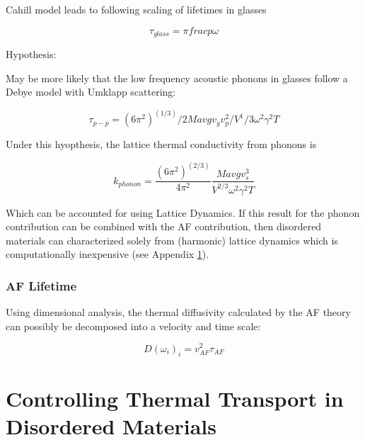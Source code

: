 \documentclass[letterpaper,12pt]{article}
\begin{document}
Cahill model leads to following scaling of lifetimes in glasses\cite{PhysRevB.46.6131}

\begin{equation}\label{EQ:M:l_glass}
\tau_{glass} =  \pi frac{p}{\omega}
\end{equation}

Hypothesis:

May be more likely that the low frequency acoustic phonons in glasses follow a Debye model with Umklapp scattering:

\begin{equation}\label{EQ:M:tau_p-p}
\tau_{p-p} = (6 \pi^2)^(1/3)/2 Mavg v_g v_p^2 / V^1/3 \omega^2 \gamma^2 T
\end{equation}

Under this hyopthesis, the lattice thermal conductivity from phonons is

\begin{equation}\label{EQ:M:k_thermal}
k_{phonon} = \frac{(6 \pi^2)^(2/3)}{4 \pi^2} \frac{ Mavg v_s^3}{ V^{2/3} \omega^2 \gamma^2 T}
\end{equation}

Which can be accounted for using Lattice Dynamics.  If this result for the phonon contribution can be combined with the AF contribution, then disordered materials can characterized solely from (harmonic) lattice dynamics which is computationally inexpensive (see Appendix \ref{}).


\subsubsection{\label{S-MD-SW}AF Lifetime}

Using dimensional analysis, the thermal diffusivity calculated by the AF theory can possibly be decomposed into a velocity and time scale:

\begin{equation}\label{EQ:M:k_thermal}
D(\omega_i)_{i} = v^2_{AF} \tau_{AF}
\end{equation}




\vspace*{25mm}






\clearpage

\section{\label{S-Intro-Dispersion_Disordered} Controlling Thermal Transport in Disordered Materials}
\end{document}
